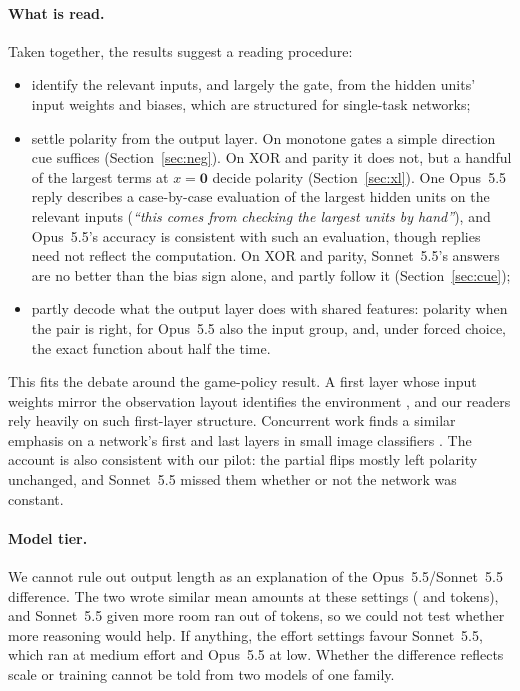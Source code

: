 \documentclass[10pt]{article}
\newcommand{\Sonnet}{Sonnet~5.5}
\newcommand{\Opus}{Opus~5.5}
\begin{document}
\paragraph{What is read.} Taken together, the results suggest a reading procedure:
\begin{itemize}
\item identify the relevant inputs, and largely the gate, from the hidden units' input weights and biases, which are structured for single-task networks;
\item settle polarity from the output layer. On monotone gates a simple direction cue suffices (Section~\ref{sec:neg}). On XOR and parity it does not, but a handful of the largest terms at $x=\mathbf{0}$ decide polarity (Section~\ref{sec:xl}). One \Opus{} reply describes a case-by-case evaluation of the largest hidden units on the relevant inputs (\emph{``this comes from checking the largest units by hand''}), and \Opus's accuracy is consistent with such an evaluation, though replies need not reflect the computation. On XOR and parity, \Sonnet's answers are no better than the bias sign alone, and partly follow it (Section~\ref{sec:cue});
\item partly decode what the output layer does with shared features: polarity when the pair is right, for \Opus{} also the input group, and, under forced choice, the exact function about half the time.
\end{itemize}
This fits the debate around the game-policy result. A first layer whose input weights mirror the observation layout identifies the environment \citep{goedecke2026}, and our readers rely heavily on such first-layer structure. Concurrent work finds a similar emphasis on a network's first and last layers in small image classifiers \citep{ahmed2026memorization}. The account is also consistent with our pilot: the partial flips mostly left polarity unchanged, and \Sonnet{} missed them whether or not the network was constant.

\paragraph{Model tier.} We cannot rule out output length as an explanation of the \Opus/\Sonnet{} difference. The two wrote similar mean amounts at these settings (\nOpusMeanOut{} and \nSonMeanOut{} tokens), and \Sonnet{} given more room ran out of tokens, so we could not test whether more reasoning would help. If anything, the effort settings favour \Sonnet, which ran at medium effort and \Opus{} at low. Whether the difference reflects scale or training cannot be told from two models of one family.
\end{document}
